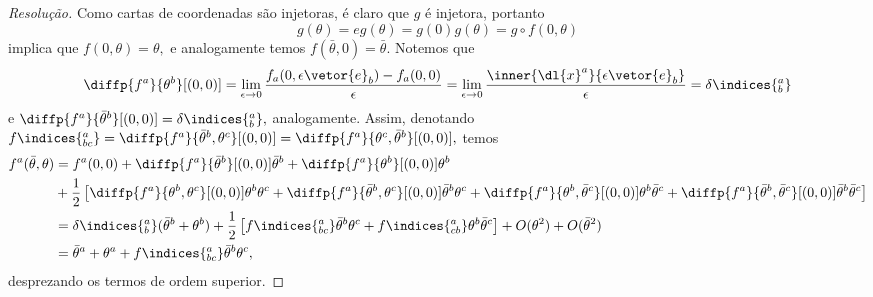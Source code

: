 \begin{proof}[Resolução]
    Como cartas de coordenadas são injetoras, é claro que \(g\) é injetora, portanto 
    \begin{equation*}
     g(\theta) = eg(\theta) = g(0) g(\theta) = g\circ f(0,\theta)
    \end{equation*}
    implica que \(f(0,\theta) = \theta,\) e analogamente temos \(f(\bar{\theta}, 0) = \bar{\theta}.\) Notemos que
    \begin{equation*}
       \diffp{f^a}{\theta^b}[(0,0)] = \lim_{\epsilon \to 0}{\frac{f_a(0, \epsilon \vetor{e}_b) - f_a(0,0)}{\epsilon}} = \lim_{\epsilon \to 0}{\frac{\inner{\dl{x}^a}{\epsilon \vetor{e}_b}}{\epsilon}} = \delta\indices{^a_b}
    \end{equation*}
    e \(\diffp{f^a}{\bar{\theta}^b}[(0,0)] = \delta\indices{^a_b},\) analogamente. Assim, denotando \(f\indices{^a_{bc}} = \diffp{f^a}{\bar{\theta}^b,\theta^c}[(0,0)] = \diffp{f^a}{\theta^c,\bar{\theta}^b}[(0,0)],\) temos
    \begin{align*}
       f^a(\bar{\theta}, \theta) 
       &= f^a(0,0) + \diffp{f^a}{\bar{\theta}^b}[(0,0)] \bar{\theta}^b + \diffp{f^a}{\theta^b}[(0,0)]\theta^b\\
       &{}+ \frac12 \left[\diffp{f^a}{\theta^b,\theta^c}[(0,0)] \theta^b \theta^c + \diffp{f^a}{\bar{\theta}^b,\theta^c}[(0,0)] \bar{\theta}^b \theta^c + \diffp{f^a}{\theta^b,\bar{\theta}^c}[(0,0)] \theta^b \bar{\theta}^c + \diffp{f^a}{\bar{\theta}^b,\bar{\theta}^c}[(0,0)] \bar{\theta}^b \bar{\theta}^c \right]\\
       &= \delta\indices{^a_b}(\bar{\theta}^b + \theta^b) + \frac12\left[ f\indices{^a_{bc}} \bar{\theta}^b \theta^c + f\indices{^a_{cb}}\theta^b \bar{\theta}^c\right] + O(\theta^2) + O(\bar{\theta}^2)\\
       &= \bar{\theta}^a + \theta^a + f\indices{^a_{bc}}\bar{\theta}^b\theta^c,
    \end{align*}
    desprezando os termos de ordem superior.


\end{proof}
